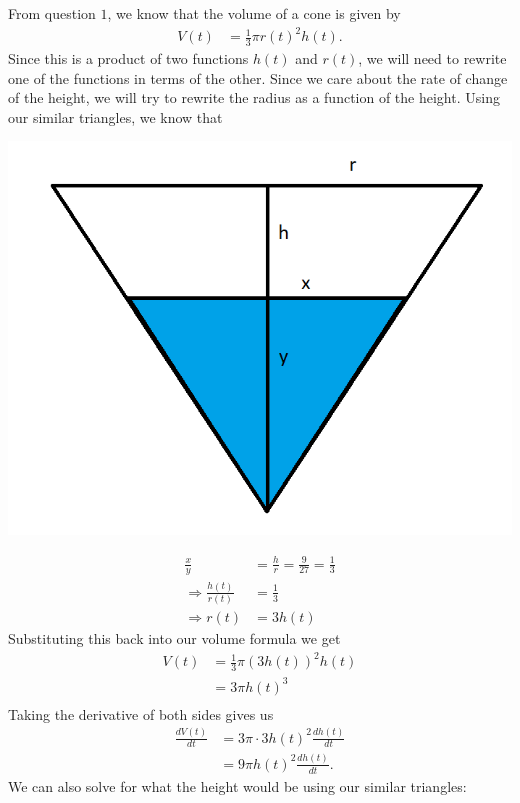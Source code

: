 \documentclass[12pt]{article}
\theoremstyle{remark}
\begin{document}
\begin{enumerate}
\begin{mdframed}[style=TheoremFrame]
From question $1$, we know that the volume of a cone is given by
\begin{align*}
V(t) &= \frac{1}{3} \pi r(t)^2 h(t).
\end{align*}
Since this is a product of two functions $h(t)$ and $r(t)$, we will need to rewrite one of the functions in terms of the other. Since we care about the rate of change of the height, we will try to rewrite the radius as a function of the height. Using our similar triangles, we know that
\begin{center}
\includegraphics[scale=0.5]{simtriangles}
\end{center}
\begin{align*}
\frac{x}{y} &= \frac{h}{r} = \frac{9}{27} = \frac{1}{3}\\
\Rightarrow \frac{h(t)}{r(t)} &= \frac{1}{3}\\
\Rightarrow r(t) &= 3h(t)
\end{align*}
Substituting this back into our volume formula we get
\begin{align*}
V(t) &= \frac{1}{3} \pi (3 h(t))^2 h(t)\\
&= 3\pi h(t)^3\\
\end{align*}
Taking the derivative of both sides gives us
\begin{align*}
\frac{dV(t)}{dt} &= 3\pi \cdot 3h(t)^2 \frac{dh(t)}{dt}\\
&= 9\pi h(t)^2 \frac{dh(t)}{dt}.
\end{align*}
We can also solve for what the height would be using our similar triangles:
\begin{align*}

\end{align*}
\end{mdframed}
\end{enumerate}
\end{document}

